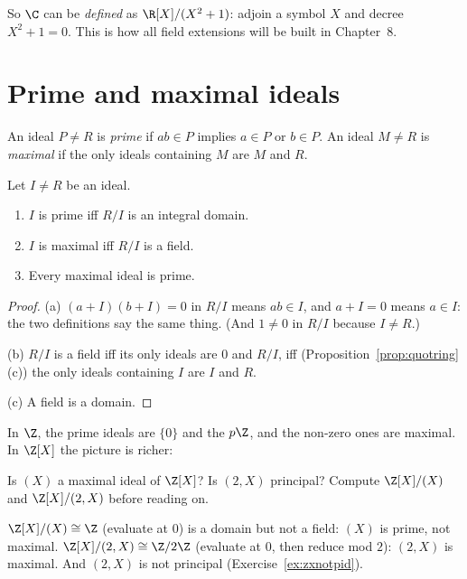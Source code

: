 So $\C$ can be \emph{defined} as $\R[X]/(X^2+1)$: adjoin a symbol $X$ and decree $X^2+1=0$. This is how all field extensions will be built in Chapter~8.

\section{Prime and maximal ideals}

\begin{definition}
An ideal $P\ne R$ is \emph{prime} if $ab\in P$ implies $a\in P$ or $b\in P$. An ideal $M\ne R$ is \emph{maximal} if the only ideals containing $M$ are $M$ and $R$.
\end{definition}

\begin{proposition}\label{prop:primemax}
Let $I\ne R$ be an ideal.
\begin{enumerate}[label=(\alph*)]
\item $I$ is prime iff $R/I$ is an integral domain.
\item $I$ is maximal iff $R/I$ is a field.
\item Every maximal ideal is prime.
\end{enumerate}
\end{proposition}
\begin{proof}
(a) $(a+I)(b+I)=0$ in $R/I$ means $ab\in I$, and $a+I=0$ means $a\in I$: the two definitions say the same thing. (And $1\ne0$ in $R/I$ because $I\ne R$.)

(b) $R/I$ is a field iff its only ideals are $0$ and $R/I$, iff (Proposition~\ref{prop:quotring}(c)) the only ideals containing $I$ are $I$ and $R$.

(c) A field is a domain.
\end{proof}

In $\Z$, the prime ideals are $\{0\}$ and the $p\Z$, and the non-zero ones are maximal. In $\Z[X]$ the picture is richer:

\begin{think}
Is $(X)$ a maximal ideal of $\Z[X]$? Is $(2,X)$ principal? Compute $\Z[X]/(X)$ and $\Z[X]/(2,X)$ before reading on.
\end{think}

$\Z[X]/(X)\cong\Z$ (evaluate at $0$) is a domain but not a field: $(X)$ is prime, not maximal. $\Z[X]/(2,X)\cong\Z/2\Z$ (evaluate at $0$, then reduce mod $2$): $(2,X)$ is maximal. And $(2,X)$ is not principal (Exercise~\ref{ex:zxnotpid}).

